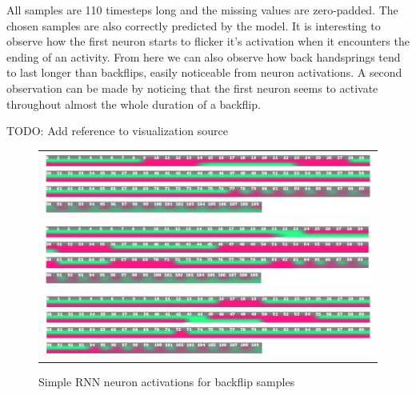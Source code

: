 All samples are 110 timesteps long and the missing values are zero-padded. The chosen samples are also correctly predicted by the model. It is interesting to observe how the first neuron starts to flicker it's activation when it encounters the ending of an activity. From here we can also observe how back handsprings tend to last longer than backflips, easily noticeable from neuron activations. A second observation can be made by noticing that the first neuron seems to activate throughout almost the whole duration of a backflip. 

TODO: Add reference to visualization source

\begin{figure}
   \centering
\begin{tabular}{c}
\includegraphics[width=\textwidth]{images/classifier/neuron-activations-simple-rnn-model-3/backflip-23-tiit}\\
\includegraphics[width=\textwidth]{images/classifier/neuron-activations-simple-rnn-model-3/backflip-40-margus}\\
\includegraphics[width=\textwidth]{images/classifier/neuron-activations-simple-rnn-model-3/backflip-6-rasmus}\\
\end{tabular}
    \caption{Simple RNN neuron activations for backflip samples}
    \label{backflip-neuron-activations-simple-rnn}
\end{figure}

